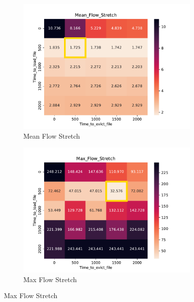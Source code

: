 \documentclass[a4paper]{article}
\begin{document}
\begin{figure}[H]\centering
\begin{subfigure}[b]{0.4\linewidth}\centering\includegraphics[width=1\linewidth]{MBSS/plot/Heatmap_Stretch_FCFS_Score_Time_to_load_file_Time_to_evict_file_2022-01-24->2022-01-24_450_128_32_256_4_1024.pdf}\caption{Mean Flow Stretch}\end{subfigure}
\begin{subfigure}[b]{0.4\linewidth}\centering\includegraphics[width=1\linewidth]{MBSS/plot/Heatmap_Max_Stretch_FCFS_Score_Time_to_load_file_Time_to_evict_file_2022-01-24->2022-01-24_450_128_32_256_4_1024.pdf}\caption{Max Flow Stretch}\end{subfigure}

\end{figure}
\end{document}
